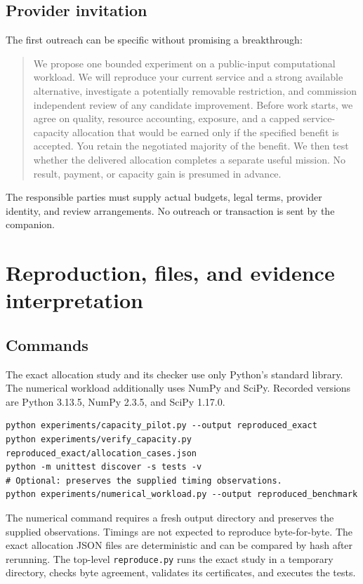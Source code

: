 \documentclass[11pt,letterpaper]{article}
\theoremstyle{remark}\newtheorem{remark}{Remark}[section]
\begin{document}
\subsection{Provider invitation}
The first outreach can be specific without promising a breakthrough:
\begin{quote}
We propose one bounded experiment on a public-input computational workload. We will reproduce your current service and a strong available alternative, investigate a potentially removable restriction, and commission independent review of any candidate improvement. Before work starts, we agree on quality, resource accounting, exposure, and a capped service-capacity allocation that would be earned only if the specified benefit is accepted. You retain the negotiated majority of the benefit. We then test whether the delivered allocation completes a separate useful mission. No result, payment, or capacity gain is presumed in advance.
\end{quote}
The responsible parties must supply actual budgets, legal terms, provider identity, and review arrangements. No outreach or transaction is sent by the companion.

\section{Reproduction, files, and evidence interpretation}
\subsection{Commands}
The exact allocation study and its checker use only Python's standard library. The numerical workload additionally uses NumPy and SciPy. Recorded versions are Python 3.13.5, NumPy 2.3.5, and SciPy 1.17.0.
\begin{lstlisting}
python experiments/capacity_pilot.py --output reproduced_exact
python experiments/verify_capacity.py reproduced_exact/allocation_cases.json
python -m unittest discover -s tests -v
# Optional: preserves the supplied timing observations.
python experiments/numerical_workload.py --output reproduced_benchmark
\end{lstlisting}
The numerical command requires a fresh output directory and preserves the supplied observations. Timings are not expected to reproduce byte-for-byte. The exact allocation JSON files are deterministic and can be compared by hash after rerunning. The top-level \texttt{reproduce.py} runs the exact study in a temporary directory, checks byte agreement, validates its certificates, and executes the tests.
\end{document}
